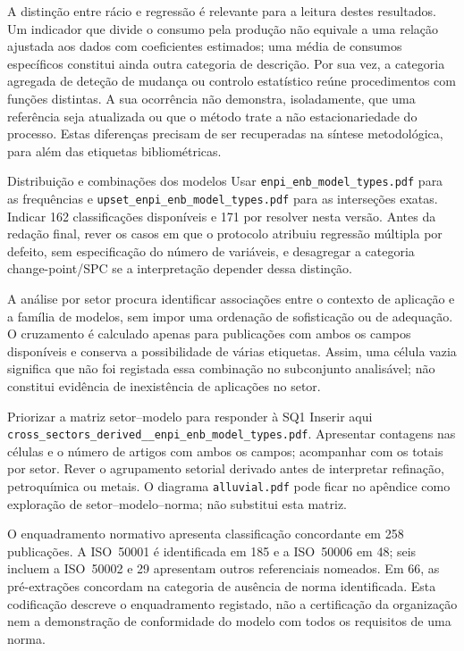 A distinção entre rácio e regressão é relevante para a leitura
destes resultados. Um indicador que divide o consumo pela produção
não equivale a uma relação ajustada aos dados com coeficientes
estimados; uma média de consumos específicos constitui ainda
outra categoria de descrição. Por sua vez, a categoria agregada
de deteção de mudança ou controlo estatístico reúne procedimentos
com funções distintas. A sua ocorrência não demonstra, isoladamente,
que uma referência seja atualizada ou que o método trate a
não estacionariedade do processo. Estas diferenças precisam de
ser recuperadas na síntese metodológica, para além das etiquetas
bibliométricas.

{Distribuição e combinações dos modelos}
{Usar \texttt{enpi\_enb\_model\_types.pdf} para as frequências
e \texttt{upset\_enpi\_enb\_model\_types.pdf} para as
interseções exatas. Indicar 162 classificações disponíveis e 171
por resolver nesta versão. Antes da redação final, rever os casos
em que o protocolo atribuiu regressão múltipla por defeito, sem
especificação do número de variáveis, e desagregar a categoria
change-point/SPC se a interpretação depender dessa distinção.}%

A análise por setor procura identificar associações entre o contexto
de aplicação e a família de modelos, sem impor uma ordenação de
sofisticação ou de adequação. O cruzamento é calculado apenas para
publicações com ambos os campos disponíveis e conserva a possibilidade
de várias etiquetas. Assim, uma célula vazia significa que não
foi registada essa combinação no subconjunto analisável; não
constitui evidência de inexistência de aplicações no setor.

{Priorizar a matriz setor--modelo para responder à SQ1}
{Inserir aqui
\nolinkurl{cross_sectors_derived__enpi_enb_model_types.pdf}.
Apresentar contagens nas células e o número de artigos com ambos
os campos; acompanhar com os totais por setor. Rever o agrupamento
setorial derivado antes de interpretar refinação, petroquímica
ou metais. O diagrama \texttt{alluvial.pdf} pode ficar no apêndice
como exploração de setor--modelo--norma; não substitui esta matriz.}%

O enquadramento normativo apresenta classificação concordante em
258 publicações. A ISO~50001 é identificada em 185 e a ISO~50006
em 48; seis incluem a ISO~50002 e 29 apresentam outros referenciais
nomeados. Em 66, as pré-extrações concordam na categoria de ausência
de norma identificada. Esta codificação descreve o enquadramento
registado, não a certificação da organização nem a demonstração
de conformidade do modelo com todos os requisitos de uma norma.


